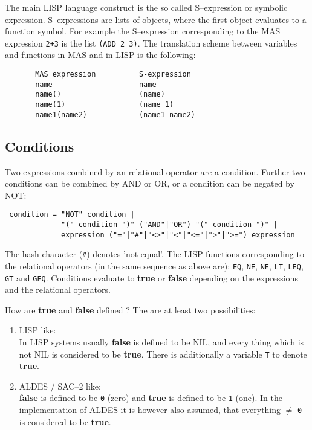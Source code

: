 {\small
The main LISP language construct is the so called 
S--expression or symbolic expression.
S--expressions are lists of objects, where the 
first object evaluates to a function symbol. 
For example the S--expression corresponding to 
the MAS expression \verb/2+3/ is the list \verb/(ADD 2 3)/.
The translation scheme between variables and functions 
in MAS and in LISP is the following:
\begin{verbatim}
       MAS expression          S-expression
       name                    name
       name()                  (name)
       name(1)                 (name 1)
       name1(name2)            (name1 name2)
\end{verbatim}
}


\subsection{Conditions} 

Two expressions combined by an relational operator 
are a condition. Further two conditions can be
combined by AND or OR, or a condition can be negated by NOT:
\begin{verbatim}
 condition = "NOT" condition |
             "(" condition ")" ("AND"|"OR") "(" condition ")" |
             expression ("="|"#"|"<>"|"<"|"<="|">"|">=") expression
\end{verbatim}
The hash character (\verb/#/) denotes 'not equal'. 
The LISP functions corresponding to the relational operators
(in the same sequence as above are):
\verb/EQ/, \verb/NE/, \verb/NE/, \verb/LT/, 
\verb/LEQ/, \verb/GT/ and \verb/GEQ/.
Conditions evaluate to {\bf true} or {\bf false} depending
on the expressions and the relational operators.

How are {\bf true} and {\bf false} defined ?
The are at least two possibilities:
\begin{enumerate}
\item LISP like: \\
      In LISP systems usually {\bf false} is defined to
      be NIL, and every thing which is not NIL is considered
      to be {\bf true}.
      There is additionally a variable \verb/T/ to denote {\bf true}.
\item ALDES / SAC--2 like: \\
      {\bf false} is defined to be \verb/0/ (zero) and
      {\bf true} is defined to be \verb/1/ (one).
      In the implementation of ALDES it is however also
      assumed, that everything $\neq$ \verb/0/ is 
      considered to be {\bf true}. 
\end{enumerate}

